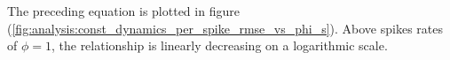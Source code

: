 \begin{enumerate}
The preceding equation is plotted in figure (\ref{fig:analysis:const_dynamics_per_spike_rmse_vs_phi_s}). Above spikes rates of $\phi = 1$, the relationship is linearly decreasing on a logarithmic scale.


\end{enumerate}
